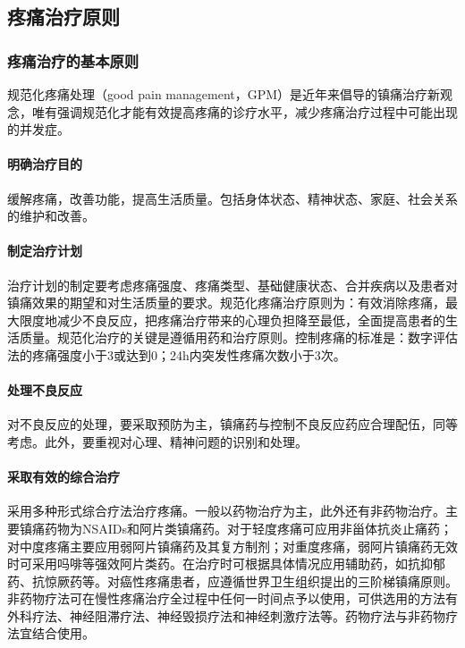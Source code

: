 \subsection{疼痛治疗原则}

\subsubsection{疼痛治疗的基本原则}

规范化疼痛处理（good pain
management，GPM）是近年来倡导的镇痛治疗新观念，唯有强调规范化才能有效提高疼痛的诊疗水平，减少疼痛治疗过程中可能出现的并发症。
\paragraph{明确治疗目的}

缓解疼痛，改善功能，提高生活质量。包括身体状态、精神状态、家庭、社会关系的维护和改善。
\paragraph{制定治疗计划}

治疗计划的制定要考虑疼痛强度、疼痛类型、基础健康状态、合并疾病以及患者对镇痛效果的期望和对生活质量的要求。规范化疼痛治疗原则为：有效消除疼痛，最大限度地减少不良反应，把疼痛治疗带来的心理负担降至最低，全面提高患者的生活质量。规范化治疗的关键是遵循用药和治疗原则。控制疼痛的标准是：数字评估法的疼痛强度小于3或达到0；24h内突发性疼痛次数小于3次。
\paragraph{处理不良反应}

对不良反应的处理，要采取预防为主，镇痛药与控制不良反应药应合理配伍，同等考虑。此外，要重视对心理、精神问题的识别和处理。
\paragraph{采取有效的综合治疗}

采用多种形式综合疗法治疗疼痛。一般以药物治疗为主，此外还有非药物治疗。主要镇痛药物为NSAIDs和阿片类镇痛药。对于轻度疼痛可应用非甾体抗炎止痛药；对中度疼痛主要应用弱阿片镇痛药及其复方制剂；对重度疼痛，弱阿片镇痛药无效时可采用吗啡等强效阿片类药。在治疗时可根据具体情况应用辅助药，如抗抑郁药、抗惊厥药等。对癌性疼痛患者，应遵循世界卫生组织提出的三阶梯镇痛原则。非药物疗法可在慢性疼痛治疗全过程中任何一时间点予以使用，可供选用的方法有外科疗法、神经阻滞疗法、神经毁损疗法和神经刺激疗法等。药物疗法与非药物疗法宜结合使用。

